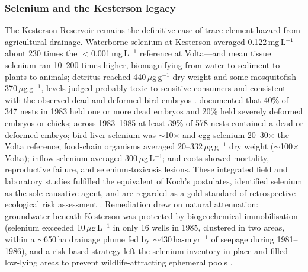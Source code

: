 \documentclass[11pt]{article}
\begin{document}
\subsubsection{Selenium and the Kesterson legacy}
The Kesterson Reservoir remains the definitive case of trace-element hazard from agricultural drainage. Waterborne selenium at Kesterson averaged 0.122\,mg\,L$^{-1}$---about 230 times the $<$0.001\,mg\,L$^{-1}$ reference at Volta---and mean tissue selenium ran 10--200 times higher, biomagnifying from water to sediment to plants to animals; detritus reached 440\,$\mu$g\,g$^{-1}$ dry weight and some mosquitofish 370\,$\mu$g\,g$^{-1}$, levels judged probably toxic to sensitive consumers and consistent with the observed dead and deformed bird embryos \parencite{SAIKI1987}. \textcite{Ohlendorf2002} documented that 40\% of 347 nests in 1983 held one or more dead embryos and 20\% held severely deformed embryos or chicks; across 1983--1985 at least 39\% of 578 nests contained a dead or deformed embryo; bird-liver selenium was $\sim$10$\times$ and egg selenium 20--30$\times$ the Volta reference; food-chain organisms averaged 20--332\,$\mu$g\,g$^{-1}$ dry weight ($\sim$100$\times$ Volta); inflow selenium averaged 300\,$\mu$g\,L$^{-1}$; and coots showed mortality, reproductive failure, and selenium-toxicosis lesions. These integrated field and laboratory studies fulfilled the equivalent of Koch's postulates, identified selenium as the sole causative agent, and are regarded as a gold standard of retrospective ecological risk assessment \parencite{Ohlendorf2002}. Remediation drew on natural attenuation: groundwater beneath Kesterson was protected by biogeochemical immobilisation (selenium exceeded 10\,$\mu$g\,L$^{-1}$ in only 16 wells in 1985, clustered in two areas, within a $\sim$650\,ha drainage plume fed by $\sim$430\,ha-m\,yr$^{-1}$ of seepage during 1981--1986), and a risk-based strategy left the selenium inventory in place and filled low-lying areas to prevent wildlife-attracting ephemeral pools \parencite{BENSON1993}.
\end{document}
